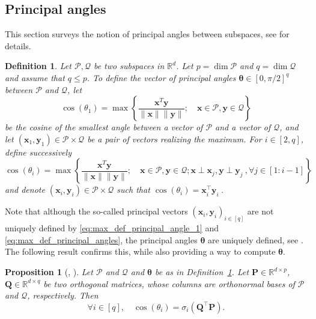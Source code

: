 \documentclass[twoside,11pt]{book}
\newtheorem{proposition}{Proposition}
\newtheorem{definition}{Definition}
\numberwithin{theorem}{chapter}
\numberwithin{definition}{chapter}
\numberwithin{proposition}{chapter}
\numberwithin{corollary}{chapter}
\numberwithin{example}{chapter}
\numberwithin{lemma}{chapter}
\numberwithin{assumption}{chapter}
\numberwithin{equation}{chapter}
\numberwithin{figure}{chapter}
\DeclareMathOperator{\Tran}{\intercal}
\begin{document}
\begin{subappendices}
\subsection{Principal angles}
This section surveys the notion of principal angles between subspaces, see \cite[Section 6.4.3]{GoVa96} for details.
\begin{definition}
  \label{d:angles}
Let $\mathcal{P},\mathcal{Q}$ be two subspaces in $\mathbb{R}^{d}$. Let $p= \dim\mathcal{P}$ and $q = \dim\mathcal{Q}$ and assume that $q \leq p$. To define the vector of principal angles $\bm{\theta} \in [0,\pi/2]^{q}$ between $\mathcal{P}$ and $\mathcal{Q}$, let
\begin{equation}\label{eq:max_def_principal_angle_1}
 \cos(\theta_{1}) = \max \left\{ \frac{\bm{x}^{T}\bm{y}}{\|\bm{x}\|\|\bm{y}\|}; \quad \bm{x} \in \mathcal{P}, \bm{y} \in \mathcal{Q} \right\}
\end{equation}
be the cosine of the smallest angle between a vector of $\mathcal{P}$ and a vector of $\mathcal{Q}$, and let $(\bm{x}_{1},\bm{y}_{1}) \in \mathcal{P}\times \mathcal{Q}$ be a pair of vectors realizing the maximum. For $i \in [2,q]$, define successively
\begin{equation}\label{eq:max_def_principal_angles}
 \cos(\theta_{i}) = \max \left\{\frac{\bm{x}^{T}\bm{y}}{\|\bm{x}\|\|\bm{y}\|}; \quad \bm{x} \in \mathcal{P}, \bm{y} \in \mathcal{Q}; \bm{x} \perp \bm{x}_{j}, \bm{y} \perp \bm{y}_{j}\:, \forall j \in [1:i-1] \right\}
\end{equation}
and denote $(\bm{x}_{i},\bm{y}_{i}) \in \mathcal{P}\times\mathcal{Q}$ such that $\cos(\theta_{i}) = \bm{x}_{i}^{\Tran}\bm{y}_{i} \:$.
\end{definition}
Note that although the so-called principal vectors $(\bm{x}_{i},\bm{y}_{i})_{i \in [q]}$
are not uniquely defined by \eqref{eq:max_def_principal_angle_1} and \eqref{eq:max_def_principal_angles}, the principal angles $\bm{\theta}$ are uniquely defined, see \citep{BjGo73}. The following result confirms this, while also providing a way to compute $\bm{\theta}$.
\begin{proposition}[\citealp{BjGo73}, \citealp{Ben92}]
  \label{principal_angles_theorem_1}
Let $\mathcal{P}$ and $\mathcal{Q}$ and $\bm{\theta}$ be as in Definition~\ref{d:angles}. Let $\bm{P} \in \mathbb{R}^{d \times p}$, $\bm{Q} \in \mathbb{R}^{d \times q}$ be two orthogonal matrices, whose columns are orthonormal bases of $\mathcal{P}$ and $\mathcal{Q}$, respectively. Then
\begin{equation}
 \forall i \in [q], \quad \cos(\theta_{i}) =\sigma_i(\bm{Q}^{\Tran}\bm{P}).

\end{equation}
\end{proposition}
\end{subappendices}
\end{document}
